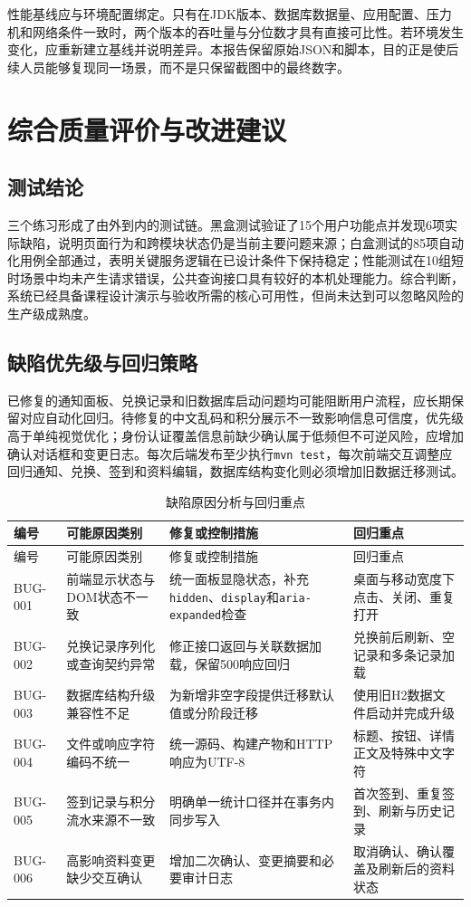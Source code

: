 \documentclass[bwprint]{report}
\begin{document}
性能基线应与环境配置绑定。只有在JDK版本、数据库数据量、应用配置、压力机和网络条件一致时，两个版本的吞吐量与分位数才具有直接可比性。若环境发生变化，应重新建立基线并说明差异。本报告保留原始JSON和脚本，目的正是使后续人员能够复现同一场景，而不是只保留截图中的最终数字。

\section{综合质量评价与改进建议}

\subsection{测试结论}
三个练习形成了由外到内的测试链。黑盒测试验证了15个用户功能点并发现6项实际缺陷，说明页面行为和跨模块状态仍是当前主要问题来源；白盒测试的85项自动化用例全部通过，表明关键服务逻辑在已设计条件下保持稳定；性能测试在10组短时场景中均未产生请求错误，公共查询接口具有较好的本机处理能力。综合判断，系统已经具备课程设计演示与验收所需的核心可用性，但尚未达到可以忽略风险的生产级成熟度。

\subsection{缺陷优先级与回归策略}
已修复的通知面板、兑换记录和旧数据库启动问题均可能阻断用户流程，应长期保留对应自动化回归。待修复的中文乱码和积分展示不一致影响信息可信度，优先级高于单纯视觉优化；身份认证覆盖信息前缺少确认属于低频但不可逆风险，应增加确认对话框和变更日志。每次后端发布至少执行\texttt{mvn test}，每次前端交互调整应回归通知、兑换、签到和资料编辑，数据库结构变化则必须增加旧数据迁移测试。

\begin{longtable}{P{1.5cm}P{3.0cm}P{4.2cm}P{4.5cm}}
\caption{缺陷原因分析与回归重点}\label{tab:defect-analysis}\\
\toprule
编号 & 可能原因类别 & 修复或控制措施 & 回归重点 \\
\midrule
\endfirsthead
\toprule
编号 & 可能原因类别 & 修复或控制措施 & 回归重点 \\
\midrule
\endhead
BUG-001 & 前端显示状态与DOM状态不一致 & 统一面板显隐状态，补充\texttt{hidden}、\texttt{display}和\texttt{aria-expanded}检查 & 桌面与移动宽度下点击、关闭、重复打开 \\
BUG-002 & 兑换记录序列化或查询契约异常 & 修正接口返回与关联数据加载，保留500响应回归 & 兑换前后刷新、空记录和多条记录加载 \\
BUG-003 & 数据库结构升级兼容性不足 & 为新增非空字段提供迁移默认值或分阶段迁移 & 使用旧H2数据文件启动并完成升级 \\
BUG-004 & 文件或响应字符编码不统一 & 统一源码、构建产物和HTTP响应为UTF-8 & 标题、按钮、详情正文及特殊中文字符 \\
BUG-005 & 签到记录与积分流水来源不一致 & 明确单一统计口径并在事务内同步写入 & 首次签到、重复签到、刷新与历史记录 \\
BUG-006 & 高影响资料变更缺少交互确认 & 增加二次确认、变更摘要和必要审计日志 & 取消确认、确认覆盖及刷新后的资料状态 \\
\bottomrule
\end{longtable}
\end{document}
